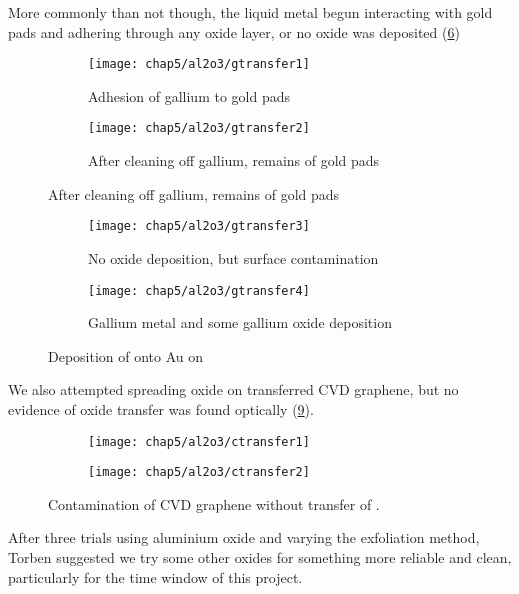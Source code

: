 \documentclass[../Matt_Gebert_Honours_Thesis.tex]{subfiles}
\begin{document}
		More commonly than not though, the liquid metal begun interacting with gold pads and adhering through any oxide layer, or no oxide was deposited (\cref{fig:transfer_al_on_au&si})
		\begin{figure}[H]
			\begin{subfigure}[t]{0.5\textwidth}
				\centering
				\texttt{[image: chap5/al2o3/gtransfer1]}
				\caption{Adhesion of gallium to gold pads}\label{fig:al2o3_g1}
			\end{subfigure}
			\begin{subfigure}[t]{0.5\textwidth}
				\centering
				\texttt{[image: chap5/al2o3/gtransfer2]}
				\caption{After cleaning off gallium, remains of gold pads}\label{fig:al2o3_g2}
			\end{subfigure}
		\end{figure}
		\begin{figure}[H]
			\ContinuedFloat
			\begin{subfigure}[t]{0.5\textwidth}
				\centering
				\texttt{[image: chap5/al2o3/gtransfer3]}
				\caption{No oxide deposition, but surface contamination}\label{fig:al2o3_g3}
			\end{subfigure}
			\begin{subfigure}[t]{0.5\textwidth}
				\centering
				\texttt{[image: chap5/al2o3/gtransfer4]}
				\caption{Gallium metal and some gallium oxide deposition}\label{fig:al2o3_g4}
			\end{subfigure}
			\caption[\aluminimumoxide{} printing onto Au on \silicondioxide{}]{Deposition of \aluminimumoxide{} onto Au on \silicondioxide{}}\label{fig:transfer_al_on_au&si}
		\end{figure}
		We also attempted spreading oxide on transferred CVD graphene, but no evidence of oxide transfer was found optically (\cref{fig:transfer_al_on_cvd}).
		\begin{figure}[H]
			\begin{subfigure}[t]{0.5\textwidth}
				\centering
				\texttt{[image: chap5/al2o3/ctransfer1]}
				\caption{}\label{fig:al2o3_c1}
			\end{subfigure}
			\begin{subfigure}[t]{0.5\textwidth}
				\centering
				\texttt{[image: chap5/al2o3/ctransfer2]}
				\caption{}\label{fig:al2o3_c2}
			\end{subfigure}
			\caption[\aluminimumoxide{} printing on CVD graphene \& \silicondioxide{}]{Contamination of CVD graphene without transfer of \aluminimumoxide{}.}\label{fig:transfer_al_on_cvd}
		\end{figure}
		After three trials using aluminium oxide and varying the exfoliation method, Torben suggested we try some other oxides for something more reliable and clean, particularly for the time window of this project. 
	
\end{document}

